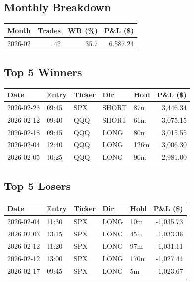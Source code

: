 \documentclass[11pt,a4paper,twoside]{article}
\begin{document}
\subsection{Monthly Breakdown}
\noindent\begin{center}
\begin{tabular}{>{\color{txtmain}}l rrr}
\toprule
\rowcolor{cardbg}
\textbf{Month} & \textbf{Trades} & \textbf{WR (\%)} & \textbf{P\&L (\$)} \\
\midrule
2026-02 & 42 & 35.7 & \textcolor{wingreen}{6,587.24} \\
\bottomrule
\end{tabular}
\end{center}
\subsection{Top 5 Winners}
\noindent\begin{center}
\begin{tabular}{>{\color{txtmain}}l llll r}
\toprule
\rowcolor{cardbg}
\textbf{Date} & \textbf{Entry} & \textbf{Ticker} & \textbf{Dir} & \textbf{Hold} & \textbf{P\&L (\$)} \\
\midrule
2026-02-23 & 09:45 & SPX & SHORT & 87m & \textcolor{wingreen}{3,446.34} \\
2026-02-12 & 09:40 & QQQ & SHORT & 61m & \textcolor{wingreen}{3,075.15} \\
2026-02-18 & 09:45 & QQQ & LONG & 80m & \textcolor{wingreen}{3,015.55} \\
2026-02-04 & 12:40 & QQQ & LONG & 126m & \textcolor{wingreen}{3,006.30} \\
2026-02-05 & 10:25 & QQQ & LONG & 90m & \textcolor{wingreen}{2,981.00} \\
\bottomrule
\end{tabular}
\end{center}
\subsection{Top 5 Losers}
\noindent\begin{center}
\begin{tabular}{>{\color{txtmain}}l llll r}
\toprule
\rowcolor{cardbg}
\textbf{Date} & \textbf{Entry} & \textbf{Ticker} & \textbf{Dir} & \textbf{Hold} & \textbf{P\&L (\$)} \\
\midrule
2026-02-04 & 11:30 & SPX & LONG & 10m & \textcolor{lossred}{-1,035.73} \\
2026-02-03 & 13:15 & SPX & LONG & 45m & \textcolor{lossred}{-1,033.36} \\
2026-02-12 & 11:20 & SPX & LONG & 97m & \textcolor{lossred}{-1,031.11} \\
2026-02-12 & 13:00 & SPX & LONG & 170m & \textcolor{lossred}{-1,027.44} \\
2026-02-17 & 09:45 & SPX & LONG & 5m & \textcolor{lossred}{-1,023.67} \\
\bottomrule
\end{tabular}
\end{center}
\clearpage
\end{document}
